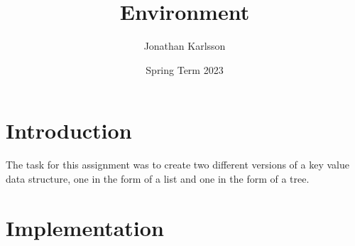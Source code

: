 \documentclass[a4paper,11pt]{article}
\begin{document}
\title{
    \textbf{Environment}
}
\author{Jonathan Karlsson}
\date{Spring Term 2023}

\maketitle

\section*{Introduction}
The task for this assignment was to create two different versions of a key value data structure, one in the form of a list and one in the form of a tree.

\section*{Implementation}
\end{document}
